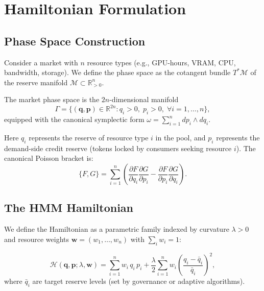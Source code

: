 \section{Hamiltonian Formulation}

\label{sec:formulation}

\subsection{Phase Space Construction}

Consider a market with $n$ resource types (e.g., GPU-hours, VRAM, CPU, bandwidth, storage). We define the phase space as the cotangent bundle $T^*\mathcal{M}$ of the reserve manifold $\mathcal{M} \subset \mathbb{R}^n_{>0}$.

\begin{definition}
The market phase space is the $2n$-dimensional manifold
\begin{equation}
\Gamma = \{(\bm{q}, \bm{p}) \in \mathbb{R}^{2n} : q_i > 0, \; p_i > 0, \; \forall i = 1, \ldots, n\},
\end{equation}
equipped with the canonical symplectic form $\omega = \sum_{i=1}^n dp_i \wedge dq_i$.
\end{definition}

Here $q_i$ represents the reserve of resource type $i$ in the pool, and $p_i$ represents the demand-side credit reserve (tokens locked by consumers seeking resource $i$). The canonical Poisson bracket is:
\begin{equation}
\{F, G\} = \sum_{i=1}^n \left(\frac{\partial F}{\partial q_i}\frac{\partial G}{\partial p_i} - \frac{\partial F}{\partial p_i}\frac{\partial G}{\partial q_i}\right).
\end{equation}

\subsection{The HMM Hamiltonian}

We define the Hamiltonian as a parametric family indexed by curvature $\lambda > 0$ and resource weights $\bm{w} = (w_1, \ldots, w_n)$ with $\sum_i w_i = 1$:

\begin{definition}
\begin{equation}
\mathcal{H}(\bm{q}, \bm{p}; \lambda, \bm{w}) = \sum_{i=1}^n w_i \, q_i \, p_i + \frac{\lambda}{2} \sum_{i=1}^n w_i \left(\frac{q_i - \bar{q}_i}{\bar{q}_i}\right)^2,
\label{eq:hamiltonian}
\end{equation}
where $\bar{q}_i$ are target reserve levels (set by governance or adaptive algorithms).
\end{definition}

